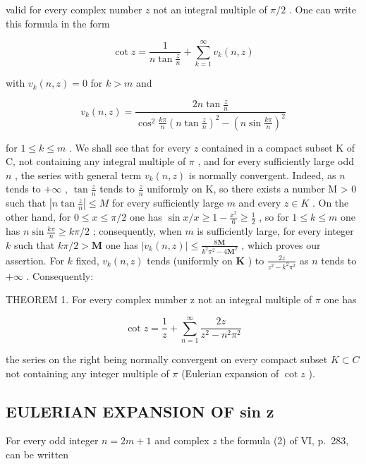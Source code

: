 valid for every complex number \(z\) not an integral multiple of \(\pi / 2\) . One can write this formula in the form

\[
\cot z = \frac {1}{n \tan \frac {z}{n}} + \sum_ {k = 1} ^ {\infty} v _ {k} (n, z)
\]

with \(v_{k}(n,z) = 0\) for \(k > m\) and

\[
v _ {k} (n, z) = \frac {2 n \tan \frac {z}{n}}{\cos^ {2} \frac {k \pi}{n} \left(n \tan \frac {z}{n}\right) ^ {2} - \left(n \sin \frac {k \pi}{n}\right) ^ {2}}
\]

for \(1 \leqslant k \leqslant m\) . We shall see that for every \(z\) contained in a compact subset K of C, not containing any integral multiple of \(\pi\) , and for every sufficiently large odd \(n\) , the series with general term \(v_{k}(n,z)\) is normally convergent. Indeed, as \(n\) tends to \(+\infty\) , \(\tan \frac{z}{n}\) tends to \(\frac{z}{n}\) uniformly on K, so there exists a number M \textgreater{} 0 such that \(\left| n \tan \frac{z}{n} \right| \leqslant M\) for every sufficiently large \(m\) and every \(z \in K\) . On the other hand, for \(0 \leqslant x \leqslant \pi/2\) one has \(\sin x/x \geqslant 1 - \frac{x^2}{6} \geqslant \frac{1}{2}\) , so for \(1 \leqslant k \leqslant m\) one has \(n \sin \frac{k\pi}{n} \geqslant k\pi/2\) ; consequently, when \(m\) is sufficiently large, for every integer \(k\) such that \(k\pi / 2 > \mathbf{M}\) one has \(|v_k(n, z)| \leqslant \frac{8\mathbf{M}}{k^2\pi^2 - 4\mathbf{M}^2}\) , which proves our assertion. For \(k\) fixed, \(v_k(n, z)\) tends (uniformly on \(\mathbf{K}\) ) to \(\frac{2z}{z^2 - k^2\pi^2}\) as \(n\) tends to \(+\infty\) . Consequently:

THEOREM 1. For every complex number z not an integral multiple of \(\pi\) one has

\[
\cot z = \frac {1}{z} + \sum_ {n = 1} ^ {\infty} \frac {2 z}{z ^ {2} - n ^ {2} \pi^ {2}}\tag{8}
\]

the series on the right being normally convergent on every compact subset \(K \subset C\) not containing any integer multiple of \(\pi\) (Eulerian expansion of \(\cot z\) ).

\subsection{EULERIAN EXPANSION OF sin z}

For every odd integer \(n = 2m + 1\) and complex \(z\) the formula (2) of VI, p.~283, can be written

